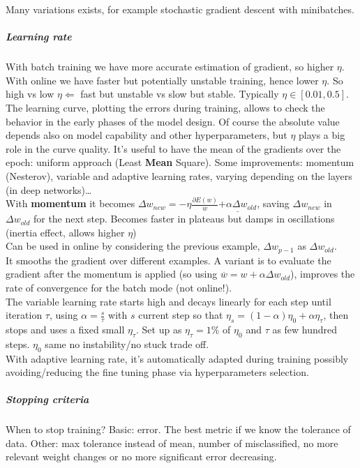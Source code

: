 \documentclass[10pt]{report}
\begin{document}
Many variations exists, for example stochastic gradient descent with minibatches.
\subparagraph{Learning rate} With batch training we have more accurate estimation of gradient, so higher $\eta$. With online we have faster but potentially unstable training, hence lower $\eta$. So high vs low $\eta \Leftarrow$ fast but unstable vs slow but stable. Typically $\eta \in [0.01, 0.5]$.\\
The learning curve, plotting the errors during training, allows to check the behavior in the early phases of the model design. Of course the absolute value depends also on model capability and other hyperparameters, but $\eta$ plays a big role in the curve quality. It's useful to have the mean of the gradients over the epoch: uniform approach (Least \textbf{Mean} Square). Some improvements: momentum (Nesterov), variable and adaptive learning rates, varying depending on the layers (in deep networks)\ldots\\
With \textbf{momentum} it becomes $\Delta w_{new} = -\eta\frac{\partial E(w)}{w} \underline{+ \alpha\Delta w_{old}}$, saving $\Delta w_{new}$ in $\Delta w_{old}$ for the next step. Becomes faster in plateaus but damps in oscillations (inertia effect, allows higher $\eta$)\\
Can be used in online by considering the previous example, $\Delta w_{p-1}$ as $\Delta w_{old}$.\\
It smooths the gradient over different examples. A variant is to evaluate the gradient after the momentum is applied (so using $\overline{w} = w + \alpha\Delta w_{old}$), improves the rate of convergence for the batch mode (not online!).\\
The variable learning rate starts high and decays linearly for each step until iteration $\tau$, using $\alpha = \frac{s}{\tau}$ with $s$ current step so that $\eta_s = (1-\alpha)\eta_0 + \alpha\eta_\tau$, then stops and uses a fixed small $\eta_\tau$. Set up as $\eta_\tau = 1\%$ of $\eta_0$ and $\tau$ as few hundred steps. $\eta_0$ same no instability/no stuck trade off.\\
With adaptive learning rate, it's automatically adapted during training possibly avoiding/reducing the fine tuning phase via hyperparameters selection.
\subparagraph{Stopping criteria} When to stop training? Basic: error. The best metric if we know the tolerance of data. Other: max tolerance instead of mean, number of misclassified, no more relevant weight changes or no more significant error decreasing.\\
\end{document}
